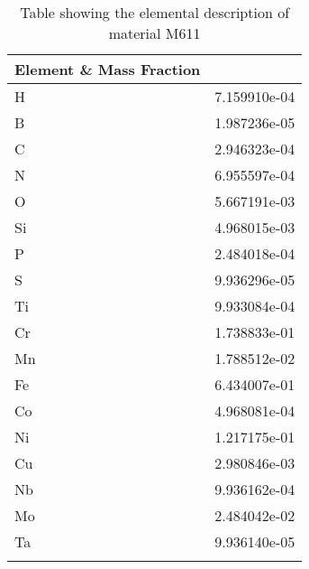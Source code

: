 \begin{centering}
\begin{longtable}[ht!]
\caption{Table showing the elemental description of material M613}
\label{table:material_M613}
\end{longtable}
\clearpage

\begin{longtable}[ht!]
{ p{} | p{} }
\hline
Element \& Mass Fraction\\
\hline
H &  7.159910e-04\\
B &  1.987236e-05\\
C &  2.946323e-04\\
N &  6.955597e-04\\
O &  5.667191e-03\\
Si &  4.968015e-03\\
P &  2.484018e-04\\
S &  9.936296e-05\\
Ti &  9.933084e-04\\
Cr &  1.738833e-01\\
Mn &  1.788512e-02\\
Fe &  6.434007e-01\\
Co &  4.968081e-04\\
Ni &  1.217175e-01\\
Cu &  2.980846e-03\\
Nb &  9.936162e-04\\
Mo &  2.484042e-02\\
Ta &  9.936140e-05\\

\caption{Table showing the elemental description of material M611}
\label{table:material_M611}
\end{longtable}
\clearpage


\end{centering}
